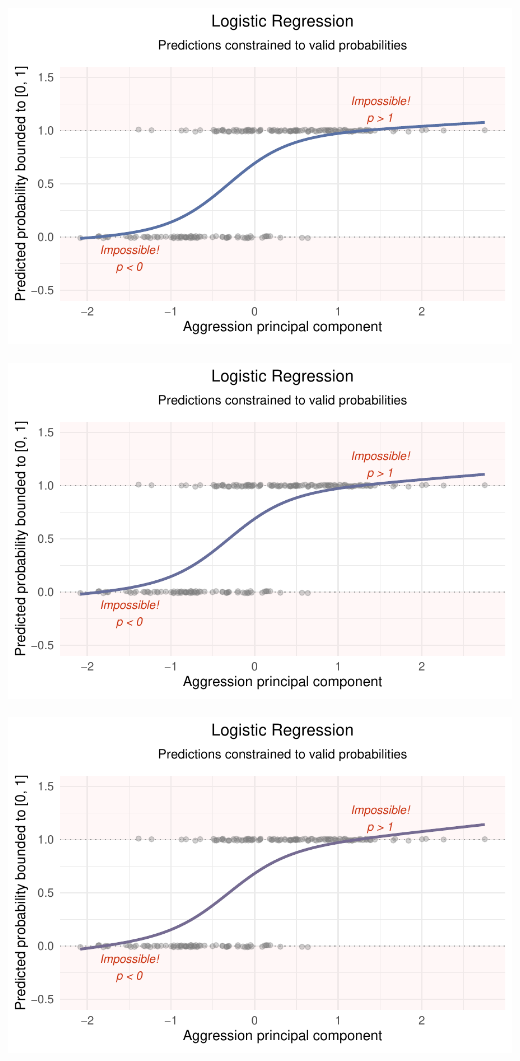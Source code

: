 \documentclass[
  letterpaper,
  DIV=11,
  numbers=noendperiod]{scrartcl}
\begin{document}
\begin{center}
\includegraphics[width=0.8\linewidth,height=\textheight,keepaspectratio]{Beyond!!!_files/figure-pdf/unnamed-chunk-4-81.pdf}
\end{center}

\begin{center}
\includegraphics[width=0.8\linewidth,height=\textheight,keepaspectratio]{Beyond!!!_files/figure-pdf/unnamed-chunk-4-82.pdf}
\end{center}

\begin{center}
\includegraphics[width=0.8\linewidth,height=\textheight,keepaspectratio]{Beyond!!!_files/figure-pdf/unnamed-chunk-4-83.pdf}
\end{center}
\end{document}
